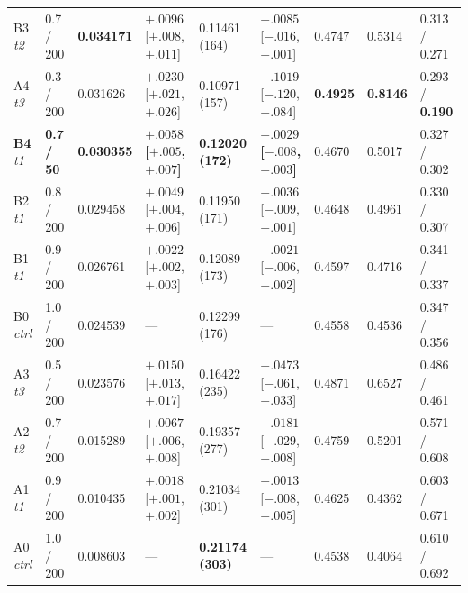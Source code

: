 \documentclass[11pt]{article}
\newcommand{\best}[1]{\textbf{#1}}
\begin{document}
\begin{table}[ht]
{\begin{tabular}{lllllllll}
    \midrule
    B3 \emph{t2} & 0.7 / 200 & \best{0.034171} & $+.0096$ [$+.008$, $+.011$] & 0.11461 (164) & $-.0085$ [$-.016$, $-.001$] & 0.4747 & 0.5314 & 0.313 / 0.271 \\
    A4 \emph{t3} & 0.3 / 200 & 0.031626 & $+.0230$ [$+.021$, $+.026$] & 0.10971 (157) & $-.1019$ [$-.120$, $-.084$] & \best{0.4925} & \best{0.8146} & 0.293 / \best{0.190} \\
    \best{B4} \emph{t1} & \best{0.7 / 50} & \best{0.030355} & \best{$+.0058$ [$+.005$, $+.007$]} & \best{0.12020 (172)} & \best{$-.0029$ [$-.008$, $+.003$]} & 0.4670 & 0.5017 & 0.327 / 0.302 \\
    B2 \emph{t1} & 0.8 / 200 & 0.029458 & $+.0049$ [$+.004$, $+.006$] & 0.11950 (171) & $-.0036$ [$-.009$, $+.001$] & 0.4648 & 0.4961 & 0.330 / 0.307 \\
    B1 \emph{t1} & 0.9 / 200 & 0.026761 & $+.0022$ [$+.002$, $+.003$] & 0.12089 (173) & $-.0021$ [$-.006$, $+.002$] & 0.4597 & 0.4716 & 0.341 / 0.337 \\
    B0 \emph{ctrl} & 1.0 / 200 & 0.024539 & --- & 0.12299 (176) & --- & 0.4558 & 0.4536 & 0.347 / 0.356 \\
    A3 \emph{t3} & 0.5 / 200 & 0.023576 & $+.0150$ [$+.013$, $+.017$] & 0.16422 (235) & $-.0473$ [$-.061$, $-.033$] & 0.4871 & 0.6527 & 0.486 / 0.461 \\
    A2 \emph{t2} & 0.7 / 200 & 0.015289 & $+.0067$ [$+.006$, $+.008$] & 0.19357 (277) & $-.0181$ [$-.029$, $-.008$] & 0.4759 & 0.5201 & 0.571 / 0.608 \\
    A1 \emph{t1} & 0.9 / 200 & 0.010435 & $+.0018$ [$+.001$, $+.002$] & 0.21034 (301) & $-.0013$ [$-.008$, $+.005$] & 0.4625 & 0.4362 & 0.603 / 0.671 \\
    A0 \emph{ctrl} & 1.0 / 200 & 0.008603 & --- & \best{0.21174 (303)} & --- & 0.4538 & 0.4064 & 0.610 / 0.692 \\
    \bottomrule
  \end{tabular}}
\end{table}
\end{document}
